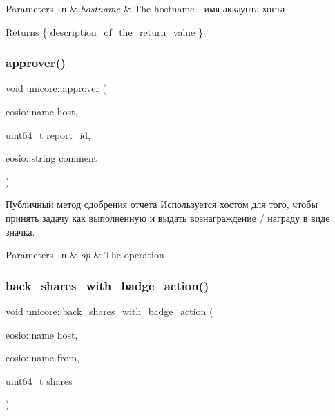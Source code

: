 \begin{DoxyParams}[1]{Parameters}
\mbox{\tt in}  & {\em hostname} & The hostname -\/ имя аккаунта хоста\\
\hline
\end{DoxyParams}
\begin{DoxyReturn}{Returns}
\{ description\+\_\+of\+\_\+the\+\_\+return\+\_\+value \} 
\end{DoxyReturn}
\mbox{\label{classunicore_a765b3c6b36dc26922fec8c1236e3d154}} 
\subsubsection{\texorpdfstring{approver()}{approver()}}
{\footnotesize\ttfamily void unicore\+::approver (\begin{DoxyParamCaption}\item[{eosio\+::name}]{host,  }\item[{uint64\+\_\+t}]{report\+\_\+id,  }\item[{eosio\+::string}]{comment }\end{DoxyParamCaption})}



Публичный метод одобрения отчета Используется хостом для того, чтобы принять задачу как выполненную и выдать вознаграждение / награду в виде значка. 


\begin{DoxyParams}[1]{Parameters}
\mbox{\tt in}  & {\em op} & The operation \\
\hline
\end{DoxyParams}
\mbox{\label{classunicore_aa78e3ba614a74bf7edd3fdfa0b048b23}} 
\subsubsection{\texorpdfstring{back\+\_\+shares\+\_\+with\+\_\+badge\+\_\+action()}{back\_shares\_with\_badge\_action()}}
{\footnotesize\ttfamily void unicore\+::back\+\_\+shares\+\_\+with\+\_\+badge\+\_\+action (\begin{DoxyParamCaption}\item[{eosio\+::name}]{host,  }\item[{eosio\+::name}]{from,  }\item[{uint64\+\_\+t}]{shares }\end{DoxyParamCaption})\hspace{0.3cm}{\ttfamily [static]}}



